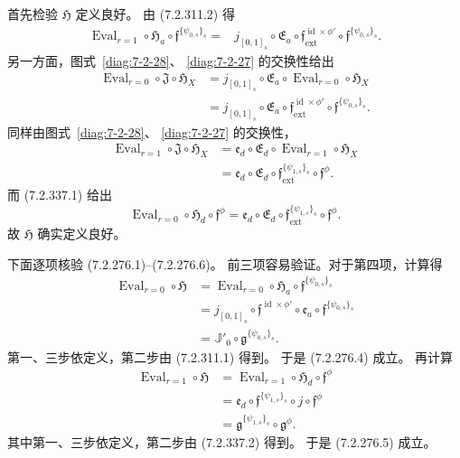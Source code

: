 首先检验 $\mathfrak H$ 定义良好。
由 (7.2.311.2) 得
\[
\begin{aligned}
\operatorname{Eval}_{r=1}\circ\mathfrak H_a
\circ\mathfrak f^{\{\psi_{0,s}\}_s}
={}&j_{[0,1]_s}\circ\mathfrak E_a
\circ\mathfrak f_{\mathrm{ext}}^{\operatorname{id}\times\phi'}
\circ\mathfrak f^{\{\psi_{0,s}\}_s}.
\end{aligned}
\]
另一方面，图式~\ref{diag:7-2-28}、
\ref{diag:7-2-27} 的交换性给出
\[
\begin{aligned}
\operatorname{Eval}_{r=0}\circ\mathfrak J\circ\mathfrak H_X
&=j_{[0,1]_s}\circ\mathfrak E_a
\circ\operatorname{Eval}_{r=0}\circ\mathfrak H_X\\
&=j_{[0,1]_s}\circ\mathfrak E_a
\circ\mathfrak f_{\mathrm{ext}}^{\operatorname{id}\times\phi'}
\circ\mathfrak f^{\{\psi_{0,s}\}_s}.
\end{aligned}
\]
同样由图式~\ref{diag:7-2-28}、
\ref{diag:7-2-27} 的交换性，
\[
\begin{aligned}
\operatorname{Eval}_{r=1}\circ\mathfrak J\circ\mathfrak H_X
&=\mathfrak e_d\circ\mathfrak E_d
\circ\operatorname{Eval}_{r=1}\circ\mathfrak H_X\\
&=\mathfrak e_d\circ\mathfrak E_d
\circ\mathfrak f_{\mathrm{ext}}^{\{\psi_{1,s}\}_s}
\circ\mathfrak f^\phi.
\end{aligned}
\]
而 (7.2.337.1) 给出
\[
\operatorname{Eval}_{r=0}\circ\mathfrak H_d
\circ\mathfrak f^\phi
=\mathfrak e_d\circ\mathfrak E_d
\circ\mathfrak f_{\mathrm{ext}}^{\{\psi_{1,s}\}_s}
\circ\mathfrak f^\phi.
\]
故 $\mathfrak H$ 确实定义良好。

下面逐项核验 (7.2.276.1)--(7.2.276.6)。
前三项容易验证。对于第四项，计算得
\[
\begin{aligned}
\operatorname{Eval}_{r=0}\circ\mathfrak H
&=\operatorname{Eval}_{r=0}\circ\mathfrak H_a
\circ\mathfrak f^{\{\psi_{0,s}\}_s}\\
&=j_{[0,1]_s}\circ
\mathfrak f^{\operatorname{id}\times\phi'}
\circ\mathfrak e_a
\circ\mathfrak f^{\{\psi_{0,s}\}_s}\\
&=\mathbb J'_0\circ
\mathfrak g^{\{\psi_{0,s}\}_s}.
\end{aligned}
\]
第一、三步依定义，第二步由 (7.2.311.1) 得到。
于是 (7.2.276.4) 成立。
再计算
\[
\begin{aligned}
\operatorname{Eval}_{r=1}\circ\mathfrak H
&=\operatorname{Eval}_{r=1}\circ\mathfrak H_d
\circ\mathfrak f^\phi\\
&=\mathfrak e_d\circ
\mathfrak f^{\{\psi_{1,s}\}_s}
\circ j\circ\mathfrak f^\phi\\
&=\mathfrak g^{\{\psi_{1,s}\}_s}
\circ\mathfrak g^\phi.
\end{aligned}
\]
其中第一、三步依定义，第二步由 (7.2.337.2) 得到。
于是 (7.2.276.5) 成立。

